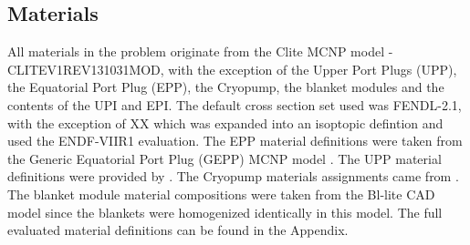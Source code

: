 \documentclass[12pt]{article}
\begin{document}
\newpage
\clearpage
\subsection{Materials}
All materials in the problem originate from the Clite MCNP model - CLITE\textunderscore V1\textunderscore REV131031\textunderscore MOD, with the exception of the Upper Port Plugs (UPP), the Equatorial Port Plug (EPP), the Cryopump, the blanket modules and the contents of the UPI and EPI. The default cross section set used was FENDL-2.1, with the exception of XX which was expanded into an isoptopic defintion and used the ENDF-VIIR1 evaluation. The EPP material definitions were taken from the Generic Equatorial Port Plug (GEPP) MCNP model \cite{epp_materials}. The UPP material definitions were provided by \cite{bertalot_communication}. The Cryopump materials assignments came from \cite{cryopump_communication}. The blanket module material compositions were taken from the Bl-lite CAD model since the blankets were homogenized identically in this model. The full evaluated material definitions can be found in the Appendix.
\end{document}

